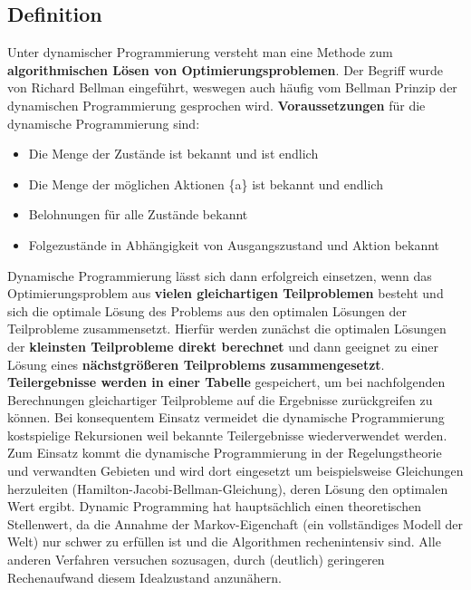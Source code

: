 \documentclass[10pt]{scrartcl}
\begin{document}
\subsection{Definition}
Unter dynamischer Programmierung versteht man eine Methode zum \textbf{algorithmischen Lösen von Optimierungsproblemen}. Der Begriff wurde von Richard Bellman eingeführt, weswegen auch häufig vom \glqq Bellman Prinzip der dynamischen Programmierung gesprochen\grqq\xspace wird. \textbf{Voraussetzungen} für die dynamische Programmierung sind:

\begin{itemize}
\item{Die Menge der Zustände ist bekannt und ist endlich}
\item{Die Menge der möglichen Aktionen \{a\} ist bekannt und endlich}
\item{Belohnungen für alle Zustände bekannt}
\item{Folgezustände in Abhängigkeit von Ausgangszustand und Aktion bekannt}
\end{itemize}

Dynamische Programmierung lässt sich dann erfolgreich einsetzen, wenn das Optimierungsproblem aus \textbf{vielen gleichartigen Teilproblemen} besteht und sich die optimale Lösung des Problems aus den optimalen Lösungen der Teilprobleme zusammensetzt. Hierfür werden zunächst die optimalen Lösungen der \textbf{kleinsten Teilprobleme direkt berechnet} und dann geeignet zu einer Lösung eines \textbf{nächstgrößeren Teilproblems zusammengesetzt}. \textbf{Teilergebnisse werden in einer Tabelle} gespeichert, um bei nachfolgenden Berechnungen gleichartiger Teilprobleme auf die Ergebnisse zurückgreifen zu können. Bei konsequentem Einsatz vermeidet die dynamische Programmierung kostspielige Rekursionen weil bekannte Teilergebnisse wiederverwendet werden.\\
Zum Einsatz kommt die dynamische Programmierung in der Regelungstheorie und verwandten Gebieten und wird dort eingesetzt um beispielsweise Gleichungen herzuleiten (Hamilton-Jacobi-Bellman-Gleichung), deren Lösung den optimalen Wert ergibt.
Dynamic Programming hat hauptsächlich einen theoretischen Stellenwert, da die Annahme der Markov-Eigenchaft
(ein vollständiges Modell der Welt) nur schwer zu erfüllen ist und die Algorithmen rechenintensiv
sind. Alle anderen Verfahren versuchen sozusagen, durch (deutlich) geringeren Rechenaufwand
diesem Idealzustand anzunähern. 
\end{document}
